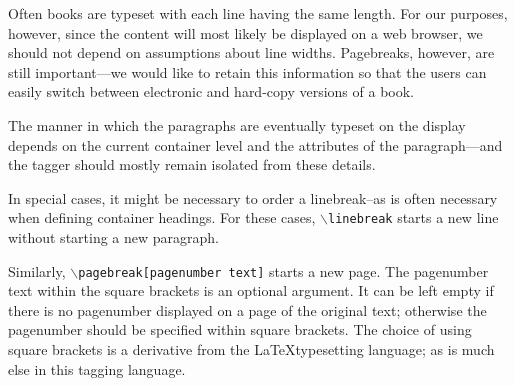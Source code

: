 \documentclass[11pt]{article}
\newcommand{\cmd}[1]{{\tt $\backslash$#1}}
\begin{document}




Often books are typeset with each line having the same length. For our
purposes, however, since the content will most likely be displayed on
a web browser, we should not depend on assumptions about line
widths. Pagebreaks, however, are still important---we would like to
retain this information so that the users can easily switch between
electronic and hard-copy versions of a book.

The manner in which the paragraphs are eventually typeset on the
display depends on the current container level and the attributes of
the paragraph---and the tagger should mostly remain isolated from these
details.

In special cases, it might be necessary to order a linebreak--as is
often necessary when defining container headings. For these cases,
\cmd{linebreak} starts a new line without starting a new
paragraph.

Similarly, \cmd{pagebreak[pagenumber text]} starts a new page. The
pagenumber text within the square brackets is an optional argument. It
can be left empty if there is no pagenumber displayed on a page of the
original text; otherwise the pagenumber should be specified within
square brackets. The choice of using square brackets is a derivative
from the \LaTeX typesetting language; as is much else in this tagging
language.
\end{document}
